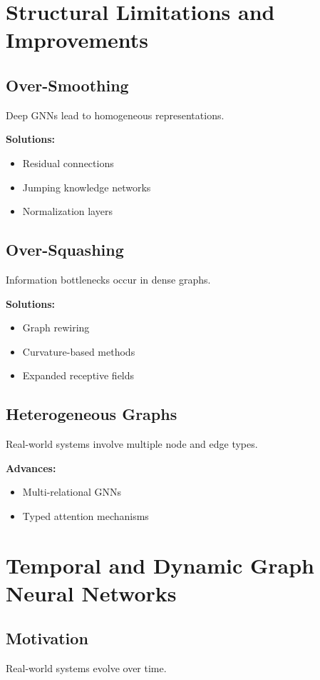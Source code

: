 \section{Structural Limitations and Improvements}

\subsection{Over-Smoothing}
Deep GNNs lead to homogeneous representations.

\textbf{Solutions:}
\begin{itemize}
\item Residual connections
\item Jumping knowledge networks
\item Normalization layers
\end{itemize}

\subsection{Over-Squashing}
Information bottlenecks occur in dense graphs.

\textbf{Solutions:}
\begin{itemize}
\item Graph rewiring
\item Curvature-based methods
\item Expanded receptive fields
\end{itemize}

\subsection{Heterogeneous Graphs}
Real-world systems involve multiple node and edge types.

\textbf{Advances:}
\begin{itemize}
\item Multi-relational GNNs
\item Typed attention mechanisms
\end{itemize}

\section{Temporal and Dynamic Graph Neural Networks}

\subsection{Motivation}
Real-world systems evolve over time.

